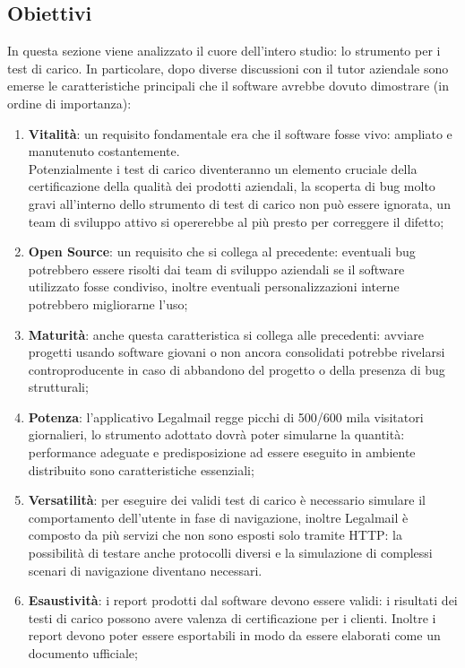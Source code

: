 \subsection{Obiettivi}
In questa sezione viene analizzato il cuore dell'intero studio: lo strumento per i test di carico. In particolare, dopo diverse discussioni con il tutor aziendale sono emerse le caratteristiche principali che il software avrebbe dovuto dimostrare (in ordine di importanza):
\begin{enumerate}
	\item \textbf{Vitalità}: un requisito fondamentale era che il software fosse vivo: ampliato e manutenuto costantemente.\\ Potenzialmente i test di carico diventeranno un elemento cruciale della certificazione della qualità dei prodotti aziendali, la scoperta di bug molto gravi all'interno dello strumento di test di carico non può essere ignorata, un team di sviluppo attivo si opererebbe al più presto per correggere il difetto;
	\item \textbf{Open Source}: un requisito che si collega al precedente: eventuali bug potrebbero essere risolti dai team di sviluppo aziendali se il software utilizzato fosse condiviso, inoltre eventuali personalizzazioni interne potrebbero migliorarne l'uso;
	\item \textbf{Maturità}: anche questa caratteristica si collega alle precedenti: avviare progetti usando software giovani o non ancora consolidati potrebbe rivelarsi controproducente in caso di abbandono del progetto o della presenza di bug strutturali;
	\item \textbf{Potenza}: l'applicativo Legalmail regge picchi di 500/600 mila visitatori giornalieri, lo strumento adottato dovrà poter simularne la quantità: performance adeguate e predisposizione ad essere eseguito in ambiente distribuito sono caratteristiche essenziali;
	\item \textbf{Versatilità}: per eseguire dei validi test di carico è necessario simulare il comportamento dell'utente in fase di navigazione, inoltre Legalmail è composto da più servizi che non sono esposti solo tramite HTTP: la possibilità di testare anche protocolli diversi e la simulazione di complessi scenari di navigazione diventano necessari.
	\item \textbf{Esaustività}: i report prodotti dal software devono essere validi: i risultati dei testi di carico possono avere valenza di certificazione per i clienti. Inoltre i report devono poter essere esportabili in modo da essere elaborati come un documento ufficiale;

\end{enumerate}
